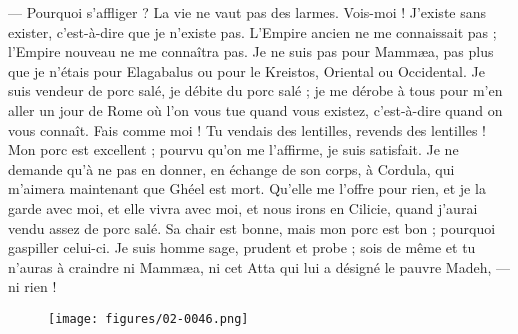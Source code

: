 \documentclass[a4paper, 11pt, oneside, polutonikogreek, french]{article}
\begin{document}
--- Pourquoi s'affliger ? La vie ne vaut pas des larmes. Vois-moi ! J'existe sans exister, c'est-à-dire que je n'existe pas. L'Empire ancien ne me connaissait pas ; l'Empire nouveau ne me connaîtra pas. Je ne suis pas pour Mammæa, pas plus que je n'étais pour Elagabalus ou pour le Kreistos, Oriental ou Occidental. Je suis vendeur de porc salé, je débite du porc salé ; je me dérobe à tous pour m'en aller un jour de Rome où l'on vous tue quand vous existez, c'est-à-dire quand on vous connaît. Fais comme moi ! Tu vendais des lentilles, revends des lentilles ! Mon porc est excellent ; pourvu qu'on me l'affirme, je suis satisfait. Je ne demande qu'à ne pas en donner, en échange de son corps, à Cordula, qui m'aimera maintenant que Ghéel est mort. Qu'elle me l'offre pour rien, et je la garde avec moi, et elle vivra avec moi, et nous irons en Cilicie, quand j'aurai vendu assez de porc salé. Sa chair est bonne, mais mon porc est bon ; pourquoi gaspiller celui-ci. Je suis homme sage, prudent et probe ; sois de même et tu n'auras à craindre ni Mammæa, ni cet Atta qui lui a désigné le pauvre Madeh, --- ni rien !
\begin{figure}[H]
\centering
\texttt{[image: figures/02-0046.png]}
\end{figure}
\clearpage
\end{document}
